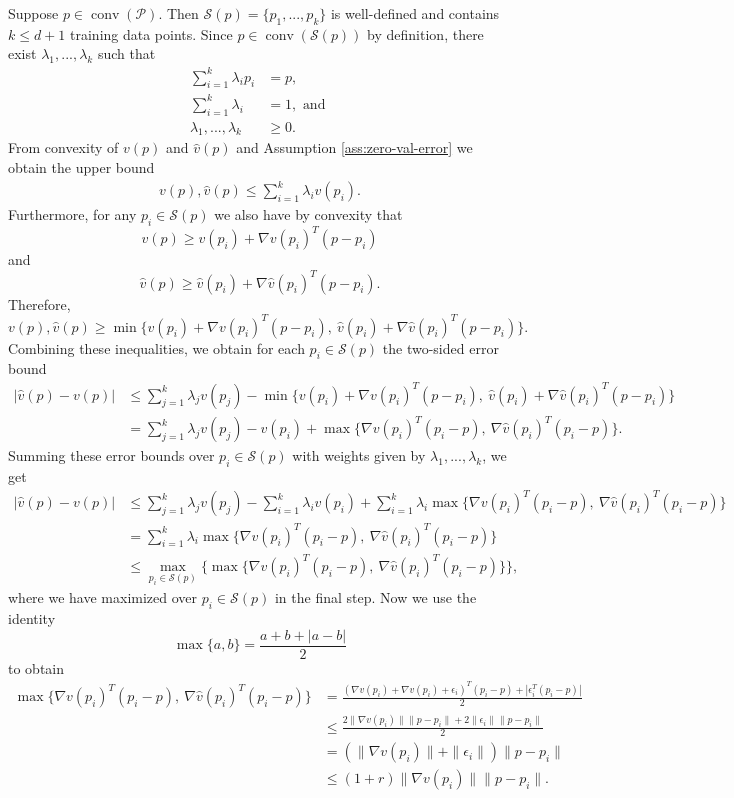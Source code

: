 \documentclass[10pt]{article} %
\theoremstyle{plain}
\theoremstyle{definition}
\theoremstyle{remark}
\begin{document}
Suppose $p \in \operatorname{conv}(\mathcal{P})$. Then $\mathcal{S}(p) = \{p_1, ..., p_k\}$ is well-defined and contains $k \leq d+1$ training data points. Since $p \in \operatorname{conv}(\mathcal{S}(p))$ by definition, there exist $\lambda_1, ..., \lambda_k$ such that
\begin{align}
    \sum_{i=1}^{k} \lambda_i p_i &= p, \\
    \sum_{i=1}^{k} \lambda_i &= 1, \text{ and } \\
    \lambda_1, ..., \lambda_k &\geq 0.
\end{align}
From convexity of $v(p)$ and $\hat{v}(p)$ and Assumption \ref{ass:zero-val-error} we obtain the upper bound
\begin{align*}
    v(p), \hat{v}(p) \leq \sum_{i=1}^{k} \lambda_i v(p_i).
\end{align*}
Furthermore, for any $p_i \in \mathcal{S}(p)$ we also have by convexity that
\[
v(p) \geq v(p_i) + \nabla v(p_i)^T(p - p_i)
\]
and
\[
    \hat{v}(p) \geq \hat{v}(p_i) + \nabla \hat{v}(p_i)^T(p - p_i).
\]
Therefore,
\[
    v(p), \hat{v}(p) \geq \min\{ v(p_i) + \nabla v(p_i)^T(p - p_i), ~\hat{v}(p_i) + \nabla \hat{v}(p_i)^T(p - p_i)\}.
\]
Combining these inequalities, we obtain for each $p_i \in \mathcal{S}(p)$ the two-sided error bound
\begin{align*}
|\hat{v}(p) - v(p)| &\leq \sum_{j=1}^{k} \lambda_j v(p_j) -\min\{ v(p_i) + \nabla v(p_i)^T(p - p_i), ~\hat{v}(p_i) + \nabla \hat{v}(p_i)^T(p - p_i)\} \\
&= \sum_{j=1}^{k} \lambda_j v(p_j) - v(p_i) + \max\{\nabla v(p_i)^T(p_i - p), ~ \nabla \hat{v}(p_i)^T(p_i - p)\}.
\end{align*}
Summing these error bounds over $p_i \in \mathcal{S}(p)$ with weights given by $\lambda_1, ..., \lambda_k$, we get
\begin{align*}
    |\hat{v}(p) - v(p)| &\leq  \sum_{j=1}^{k} \lambda_j v(p_j) - \sum_{i=1}^{k} \lambda_i v(p_i) + \sum_{i=1}^{k} \lambda_i \max\{\nabla v(p_i)^T(p_i - p), ~ \nabla \hat{v}(p_i)^T(p_i - p)\} \\
    &= \sum_{i=1}^{k} \lambda_i \max\{\nabla v(p_i)^T(p_i - p), ~ \nabla \hat{v}(p_i)^T(p_i - p)\} \\
    &\leq \max_{p_i \in \mathcal{S}(p)} \{ \max\{\nabla v(p_i)^T(p_i - p), ~ \nabla \hat{v}(p_i)^T(p_i - p)\} \}, 
\end{align*}
where we have maximized over $p_i \in \mathcal{S}(p)$ in the final step. Now we use the identity
\[
\max\{a,b\} = \frac{a + b + |a - b|}{2}
\]
to obtain 
\begin{align*}
\max\{\nabla v(p_i)^T(p_i - p), ~ \nabla \hat{v}(p_i)^T(p_i - p)\} &= \frac{(\nabla v(p_i) + \nabla v(p_i) + \epsilon_i)^T(p_i - p) + |\epsilon_i^T(p_i - p)|}{2} \\
&\leq \frac{2 \|\nabla v(p_i)\| \|p - p_i\|+ 2 \|\epsilon_i\| \|p - p_i\|}{2} \\
&= ( \| \nabla v(p_i)\| + \| \epsilon_i\|) \|p - p_i\| \\
&\leq (1 +r)\|\nabla v(p_i)\| \|p - p_i\|.
\end{align*}
\end{document}
